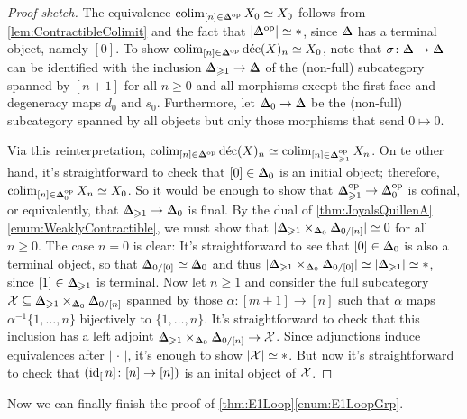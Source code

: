 \begin{proof}[Proof sketch]
	The equivalence $\colimit_{[n]\in\IDelta^\op}X_0\simeq X_0$ follows from \cref{lem:ContractibleColimit} and the fact that $\left|\IDelta^\op\right|\simeq *$, since $\IDelta$ has a terminal object, namely $[0]$. To show $\colimit_{[n]\in\IDelta^\op}\operatorname{d\acute{e}c}(X)_n\simeq X_0$, note that $\sigma\colon \IDelta\rightarrow \IDelta$ can be identified with the inclusion $\IDelta_{\geqslant 1}\rightarrow\IDelta$ of the (non-full) subcategory spanned by $[n+1]$ for all $n\geqslant 0$ and all morphisms except the first face and degeneracy maps $d_0$ and $s_0$. Furthermore, let $\IDelta_0\rightarrow \IDelta$ be the (non-full) subcategory spanned by all objects but only those morphisms that send $0\mapsto 0$.
	
	Via this reinterpretation, $\colimit_{[n]\in\IDelta^\op}\operatorname{d\acute{e}c}(X)_n\simeq \colimit_{[n]\in\IDelta_{\geqslant 1}^\op}X_n$.
	On te other hand, it's straightforward to check that $[0]\in \IDelta_0$ is an initial object; therefore, $\colimit_{[n]\in \IDelta_0^\op}X_n\simeq X_0$. So it would be enough to show that $\IDelta_{\geqslant 1}^\op\rightarrow \IDelta_0^\op$ is cofinal, or equivalently, that $\IDelta_{\geqslant 1}\rightarrow \IDelta_0$ is final. By the dual of \cref{thm:JoyalsQuillenA}\cref{enum:WeaklyContractible}, we must show that $\mathopen|\IDelta_{\geqslant 1}\times_{\IDelta_0}\IDelta_{0/[n]}\mathclose|\simeq 0$ for all $n\geqslant 0$. The case $n=0$ is clear: It's straightforward to see that $[0]\in \IDelta_{0}$ is also a terminal object, so that $\IDelta_{0/[0]}\simeq \IDelta_0$ and thus $\mathopen|\IDelta_{\geqslant 1}\times_{\IDelta_0}\IDelta_{0/[0]}\mathclose|\simeq \mathopen|\IDelta_{\geqslant 1}\mathclose|\simeq *$, since $[1]\in \IDelta_{\geqslant 1}$ is terminal. Now let $n\geqslant 1$ and consider the full subcategory $\Xx\subseteq \IDelta_{\geqslant 1}\times_{\IDelta_0}\IDelta_{0/[n]}$ spanned by those $\alpha\colon [m+1]\rightarrow [n]$ such that $\alpha$ maps $\alpha^{-1}\{1,\dotsc,n\}$ bijectively to $\{1,\dotsc,n\}$. It's straightforward to check that this inclusion has a left adjoint $\IDelta_{\geqslant 1}\times_{\IDelta_0}\IDelta_{0/[n]}\rightarrow \Xx$. Since adjunctions induce equivalences after $\left|\,\cdot\,\right|$, it's enough to show $\left|\mathcal{X}\right|\simeq *$. But now it's straightforward to check that $(\operatorname{id}_[n]\colon [n]\rightarrow [n])$ is an inital object of $\mathcal{X}$.
\end{proof}
Now we can finally finish the proof of \cref{thm:E1Loop}\cref{enum:E1LoopGrp}.
